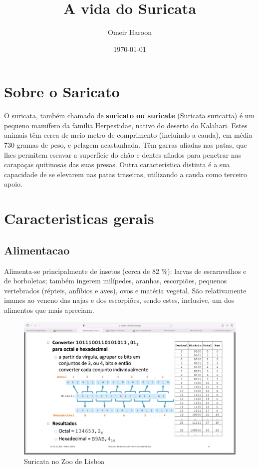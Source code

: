 \documentclass[a4paper,12pt]{article}
\title{A vida do Suricata}
\author{Omeir Haroon}
\date {\today}
\begin{document}
\maketitle
\section{Sobre o Saricato}
O suricata, também chamado de \textbf{suricato ou suricate} (Suricata suricatta) é um pequeno mamífero da família Herpestidae, nativo do deserto do Kalahari. Estes animais têm cerca de meio metro de comprimento (incluindo a cauda), em média 730 gramas de peso, e pelagem acastanhada. Têm garras afiadas nas patas, que lhes permitem escavar a superfície do chão e dentes afiados para penetrar nas carapaças quitinosas das suas presas. Outra característica distinta é a sua capacidade de se elevarem nas patas traseiras, utilizando a cauda como terceiro apoio. 

\section{Caracteristicas gerais}
\subsection{Alimentacao}
Alimenta-se principalmente de insetos (cerca de 82 \%): larvas de escaravelhos e de borboletas; também ingerem milípedes, aranhas, escorpiões, pequenos vertebrados (répteis, anfíbios e aves), ovos e matéria vegetal. São relativamente imunes ao veneno das najas e dos escorpiões, sendo estes, inclusive, um dos alimentos que mais apreciam.

\begin{figure}
   \caption{Suricata no Zoo de Lisboa}
   \centering
   \includegraphics[scale=0.38]{image}
   \end{figure}
\end{document}
